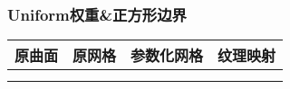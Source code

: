 \documentclass[14pt]{scrartcl} %
\begin{document}
	
	\pagebreak
	
	\subsubsection{Uniform权重\&正方形边界}
	\begin{table}[h] %
		\centering %
		\begin{tabular}{l l l l}
			\toprule
			\centering
			\textbf{原曲面} & \textbf{原网格} & \textbf{参数化网格} &\textbf{纹理映射}\\
			\midrule
			\begin{minipage}[t]{0.2\linewidth}
				\centering
			\end{minipage}&
			\begin{minipage}[t]{0.2\linewidth}
				\centering
			\end{minipage}&
			\begin{minipage}[t]{0.2\linewidth}
				\centering
			\end{minipage}&
			\begin{minipage}[t]{0.2\linewidth}
				\centering
			\end{minipage}\\
			\begin{minipage}[t]{0.2\linewidth}
				\centering
			\end{minipage}&
			\begin{minipage}[t]{0.2\linewidth}
				\centering
			\end{minipage}&
			\begin{minipage}[t]{0.2\linewidth}
				\centering
			\end{minipage}&
			\begin{minipage}[t]{0.2\linewidth}
				\centering
			\end{minipage}\\
			

\end{tabular}
\end{table}
\end{document}

